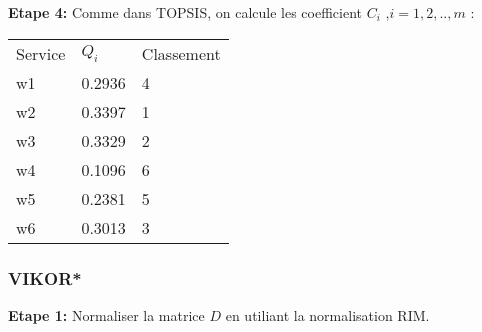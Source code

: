 \documentclass[french, 11pt, a4paper, oldfontcommands]{report}
\begin{document}
	\textbf{Etape 4:} Comme dans TOPSIS, on calcule les coefficient $C_{i}$ ,\textit{$i = 1,2,..,m$  }:
\begin{table}[ht]
	\begin{tabular}{lll}
	\rowcolor[HTML]{9B9B9B} 
	Service & $Q_i$  & Classement \\
	w1      & 0.2936 & 4          \\
	\rowcolor[HTML]{EFEFEF} 
	w2      & 0.3397 & 1          \\
	w3      & 0.3329 & 2          \\
	\rowcolor[HTML]{EFEFEF} 
	w4      & 0.1096 & 6          \\
	w5      & 0.2381 & 5          \\
	\rowcolor[HTML]{EFEFEF} 
	w6      & 0.3013 & 3         
	\end{tabular}
	\end{table}
	\newpage
	\subsubsection{VIKOR*}
	\textbf{Etape 1:} Normaliser la matrice $D$ en utiliant la normalisation RIM.
	
\end{document}
